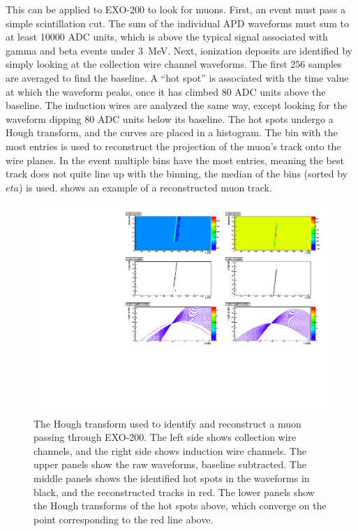 \documentclass[herrin-thesis.tex]{subfiles}
\begin{document}
This can be applied to EXO-200 to look for muons. First, an event must pass a simple scintillation cut. The sum of the individual APD waveforms must sum to at least 10000 ADC units, which is  above the typical signal associated with gamma and beta events under \SI{3}{MeV}. Next, ionization deposits are identified by simply looking at the collection wire channel waveforms. The first 256 samples are averaged to find the baseline.  A ``hot spot'' is associated with the time value at which the waveform peaks, once it has climbed 80 ADC units above the baseline. The induction wires are analyzed the same way, except looking for the waveform dipping 80 ADC units below its baseline. The hot spots undergo a Hough transform, and the curves are placed in a histogram. The bin with the most entries is used to reconstruct the projection of the muon's track onto the wire planes. In the event multiple bins have the most entries, meaning the best track does not quite line up with the binning, the median of the bins (sorted by \(eta\)) is used.  shows an example of a reconstructed muon track.

\begin{figure}[htbp]
\centering
\includegraphics[width=1\columnwidth]{./plots/muon_houghtransform_run_4685_ev_67.pdf}
\caption[Identifying a muon with the Hough transform]{The Hough transform used to identify and reconstruct a muon passing through EXO-200. The left side shows collection wire channels, and the right side shows induction wire channels. The upper panels show the raw waveforms, baseline subtracted. The middle panels shows the identified hot spots in the waveforms in black, and the reconstructed tracks in red. The lower panels show the Hough transforms of the hot spots above, which converge on the point corresponding to the red line above.}
\label{fig:muon:houghtransform}
\end{figure}
\end{document}
